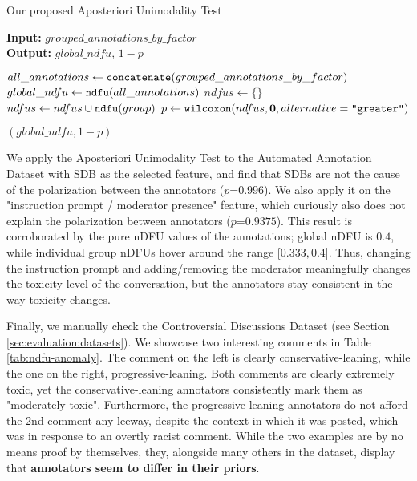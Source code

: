 \begin{algorithm}
	\caption{Our proposed Aposteriori Unimodality Test}
	\label{al:aposteriori_unimodality}
	\hspace*{\algorithmicindent} \textbf{Input:} $grouped\_annotations\_by\_factor$  \\
	\hspace*{\algorithmicindent} \textbf{Output:} $global\_ndfu$, $1 - p$ 
	\begin{algorithmic}[1]
		\State $all\_annotations \gets \texttt{concatenate}(grouped\_annotations\_by\_factor)$ 
		\State $global\_ndfu \gets \texttt{ndfu}(all\_annotations)$ 
		\State
		\State $ndfus \gets \{\}$
		\State $ndfus \gets  ndfus \cup \texttt{ndfu}(group)$ 
		\EndFor
		\State
		\State $p \gets \texttt{wilcoxon}(ndfus, \mathbf{0}, alternative=\texttt{"greater"})$
		
		\State \Return $(global\_ndfu, 1 - p)$
	\end{algorithmic}
\end{algorithm}

We apply the Aposteriori Unimodality Test to the Automated Annotation Dataset with \ac{SDB} as the selected feature, and find that \acp{SDB} are not the cause of the polarization between the annotators ($p\text{=}0.996$). We also apply it on the "instruction prompt / moderator presence" feature, which curiously also does not explain the polarization between annotators ($p\text{=}0.9375$). This result is corroborated by the pure \ac{nDFU} values of the annotations; global \ac{nDFU} is $0.4$, while individual group \acp{nDFU} hover around the range [$0.333, 0.4$]. Thus, changing the instruction prompt and adding/removing the moderator meaningfully changes the toxicity level of the conversation, but the annotators stay consistent in the way toxicity changes.

Finally, we manually check the Controversial Discussions Dataset (see Section \ref{sec:evaluation:datasets}). We showcase two interesting comments in Table \ref{tab:ndfu-anomaly}. The comment on the left is clearly conservative-leaning, while the one on the right, progressive-leaning. Both comments are clearly extremely toxic, yet the conservative-leaning annotators consistently mark them as "moderately toxic". Furthermore, the progressive-leaning annotators do not afford the 2nd comment any leeway, despite the context in which it was posted, which was in response to an overtly racist comment. While the two examples are by no means proof by themselves, they, alongside many others in the dataset, display that \textbf{annotators seem to differ in their priors}.

